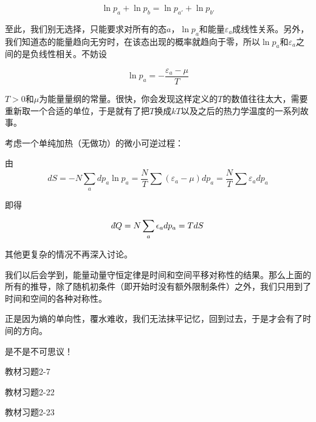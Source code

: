 \documentclass[CJK]{beamer}
\begin{document}
\begin{frame}
\bch

$$\ln p_a + \ln p_b = \ln p_{a'} + \ln p_{b'}$$

\skipline

至此，我们别无选择，只能要求对所有的态$a$，$\ln p_a$和能量$\varepsilon_a$成线性关系。另外，我们知道态的能量趋向无穷时，在该态出现的概率就趋向于零，所以$\ln p_a$和$\varepsilon_a$之间的是负线性相关。不妨设

$$\ln p_a = -\frac{\varepsilon_a - \mu}{T}$$

$T>0$和$\mu$为能量量纲的常量。很快，你会发现这样定义的$T$的数值往往太大，需要重新取一个合适的单位，于是就有了把$T$换成$kT$以及之后的热力学温度的一系列故事。
\ech
\end{frame}


\begin{frame}
\bch
考虑一个单纯加热（无做功）的微小可逆过程：

由
$$dS = -N \sum_a dp_a \ln p_a = \frac{N}{T}\sum (\varepsilon_a-\mu) dp_a = \frac{N}{T}\sum \varepsilon_a  dp_a $$

即得

$$\dbar Q = N\sum_a \epsilon_a d p_a = T dS $$

其他更复杂的情况不再深入讨论。

\ech
\end{frame}

\begin{frame}
\bch
我们以后会学到，能量动量守恒定律是时间和空间平移对称性的结果。那么上面的所有的推导，除了随机初条件（即开始时没有额外限制条件）之外，我们只用到了时间和空间的各种对称性。

\skipline
正是因为熵的单向性，覆水难收，我们无法抹平记忆，回到过去，于是才会有了时间的方向。


是不是不可思议！

\ech
\end{frame}



\begin{frame}
\bch
\bitem
\item{教材习题2-7}
\item{教材习题2-22}
\item{教材习题2-23}
\eitem
\ech
\end{frame}
\end{document}
